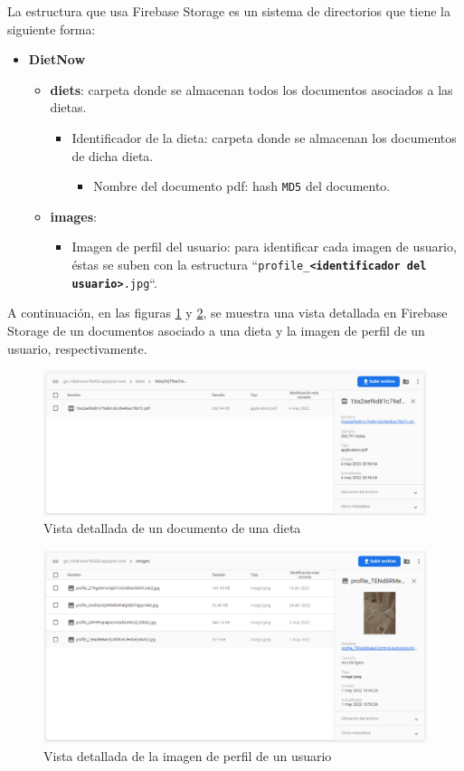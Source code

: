 La estructura que usa Firebase Storage es un sistema de directorios que tiene la siguiente forma:
\begin{itemize}
    \item \textbf{DietNow}
    \begin{itemize}
        \item \textbf{diets}: carpeta donde se almacenan todos los documentos asociados a las dietas.
            \begin{itemize}
                \item Identificador de la dieta: carpeta donde se almacenan los documentos de dicha dieta.
                \begin{itemize}
                    \item Nombre del documento pdf: hash \texttt{MD5} del documento.
                \end{itemize} 
            \end{itemize}
        \item \textbf{images}:   
            \begin{itemize}
                \item Imagen de perfil del usuario: para identificar cada imagen de usuario, éstas se suben con la estructura ``\texttt{profile\_\textbf{<identificador del usuario>}.jpg}``.
            \end{itemize}
    \end{itemize}
\end{itemize}

A continuación, en las figuras \ref{fig:storage_diet} y \ref{fig:storage_user}, se muestra una vista detallada en Firebase Storage de un documentos asociado a una dieta y la imagen de perfil de un usuario, respectivamente.

\begin{figure}[H]
    \centering
    \includegraphics[width=\textwidth]{Images/Capitulo5/dietPdf.png}
    \caption{Vista detallada de un documento de una dieta}
    \label{fig:storage_diet}
\end{figure}

\begin{figure}[H]
    \centering
    \includegraphics[width=\textwidth]{Images/Capitulo5/userImage.png}
    \caption{Vista detallada de la imagen de perfil de un usuario}
    \label{fig:storage_user}
\end{figure}